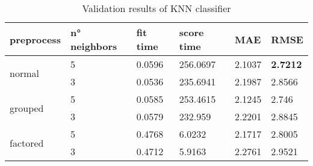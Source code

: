 \begin{table}[H]
    \centering
    \begin{tabular}{l|lllll}
    \toprule
    \textbf{preprocess} & \textbf{n° neighbors} & \textbf{fit time} & \textbf{score time} & \textbf{MAE} & \textbf{RMSE} \\ \midrule
    \multirow{2}{*}{normal}     & 5 & 0.0596 & 256.0697 & 2.1037 & \textbf{2.7212} \\
                                & 3 & 0.0536 & 235.6941 & 2.1987 & 2.8566          \\
                                \midrule
    \multirow{2}{*}{grouped}    & 5 & 0.0585 & 253.4615 & 2.1245 & 2.746           \\
                                & 3 & 0.0579 & 232.959  & 2.2201 & 2.8845          \\
                                \midrule
    \multirow{2}{*}{factored}   & 5 & 0.4768 & 6.0232   & 2.1717 & 2.8005          \\
                                & 3 & 0.4712 & 5.9163   & 2.2761 & 2.9521          \\
    \bottomrule     
    \end{tabular}
    \caption{Validation results of KNN classifier}
    \label{tab:val_knn}
    \end{table}